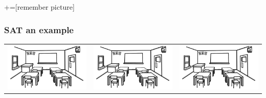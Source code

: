 \documentclass{beamer}
\begin{document}
\begin{frame}

+=[remember picture]
\frametitle{SAT an example}
\everymath{\displaystyle}
\centering


\begin{tabular}{ccc}
	\includegraphics[scale=0.07]{images/room} & \includegraphics[scale=0.07]{images/room}& \includegraphics[scale=0.07]{images/room}\\

\end{tabular}
\end{frame}
\end{document}
